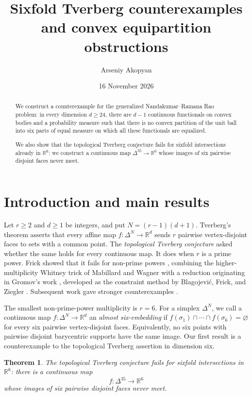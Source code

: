 \documentclass[a4paper,11pt,reqno]{amsart}
\title[Sixfold Tverberg and convex equipartitions]{Sixfold Tverberg counterexamples
 and convex equipartition obstructions}
\author{Arseniy Akopyan}
\date{16 November 2026}
\newcommand{\R}{\mathbb R}
\newtheorem{mainthm}{Theorem}
\theoremstyle{definition}
\theoremstyle{remark}
\numberwithin{equation}{section}
\begin{document}
\begin{abstract}
We construct a counterexample for the generalized Nandakumar--Ramana Rao
problem: in every dimension $d\ge24$, there are $d-1$ continuous
functionals on convex bodies and a probability measure such that there is
no convex partition of the unit ball into six parts of equal measure on
which all these functionals are equalized.

We also show that the topological Tverberg conjecture fails for sixfold
intersections already in $\R^6$: we construct a continuous map
$\Delta^{35}\to\R^6$ whose images of six pairwise disjoint faces never
meet.
\end{abstract}
\maketitle

\section{Introduction and main results}

Let $r\ge2$ and $d\ge1$ be integers, and put $N=(r-1)(d+1)$.
Tverberg's theorem asserts that every affine map
$f:\Delta^N\to\R^d$ sends $r$ pairwise vertex-disjoint faces to
sets with a common point. The \emph{topological Tverberg conjecture}
asked whether the same holds for every continuous map. It does when
$r$ is a prime power. Frick showed that it fails for non-prime
powers \cite{Frick}, combining the higher-multiplicity Whitney trick
of Mabillard and Wagner \cite{MW} with a reduction originating in
Gromov's work \cite{Gromov}, developed as the constraint method by
Blagojevi\'c, Frick, and Ziegler \cite{BFZ}. Subsequent work gave
stronger counterexamples \cite{AMS,AKS}.

The smallest non-prime-power multiplicity is $r=6$. For a simplex
$\Delta^N$, we call a continuous map $f:\Delta^N\to\R^d$ an
\emph{almost six-embedding} if
$f(\sigma_1)\cap\cdots\cap f(\sigma_6)=\varnothing$ for every six
pairwise vertex-disjoint faces. Equivalently, no six points with
pairwise disjoint barycentric supports have the same image. Our
first result is a counterexample to the topological Tverberg
assertion in dimension six.

\begin{mainthm}\label{thm:A}
The topological Tverberg conjecture fails for sixfold intersections in
$\R^6$: there is a continuous map
\[
                         f:\Delta^{35}\longrightarrow\R^6
\]
whose images of six pairwise disjoint faces never meet.
\end{mainthm}
\end{document}
